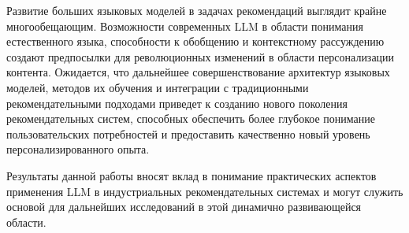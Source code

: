 Развитие больших языковых моделей в задачах рекомендаций выглядит крайне многообещающим. Возможности современных LLM в области понимания естественного языка, способности к обобщению и контекстному рассуждению создают предпосылки для революционных изменений в области персонализации контента. Ожидается, что дальнейшее совершенствование архитектур языковых моделей, методов их обучения и интеграции с традиционными рекомендательными подходами приведет к созданию нового поколения рекомендательных систем, способных обеспечить более глубокое понимание пользовательских потребностей и предоставить качественно новый уровень персонализированного опыта.

Результаты данной работы вносят вклад в понимание практических аспектов применения LLM в индустриальных рекомендательных системах и могут служить основой для дальнейших исследований в этой динамично развивающейся области.

